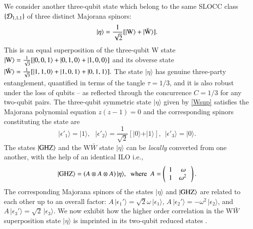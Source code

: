 {We consider another three-qubit state which belong to the same SLOCC class $\{{\cal D}_{1,1,1}\}$ of three distinct Majorana spinors: 
\begin{equation}
\vert \eta\rangle = \frac{1}{\sqrt{2}} [\vert {\rm W}\rangle +  \vert{\rm \bar{W}}\rangle].\label{Wsup}
\end{equation}         
This  is an equal superposition of the three-qubit W state $\vert{\rm W}\rangle=\frac{1}{\sqrt{3}}[\vert 0,0,1\rangle+\vert 0,1,0\rangle+\vert 1,0,0\rangle]$  
 and its obverse state $\vert{\rm \bar{W}}\rangle=\frac{1}{\sqrt{3}}[\vert 1,1,0\rangle+\vert 1,0,1\rangle+\vert 0,1,1\rangle].$ The state $\vert \eta\rangle$ has genuine three-party entanglement, quantified in terms of the tangle $\tau=1/3$, and it is also robust under the loss of qubits -- as reflected through the concurrence $C=1/3$ for any two-qubit pairs.  The three-qubit symmetric state $\vert \eta\rangle$ given by \eqref{Wsup} satisfies the Majorana polynomial equation $z(z-1)=0$  and the corresponding spinors constituting the state are 
\begin{equation}
\vert \epsilon'_1\rangle =\vert 1\rangle,\ \ \  \vert \epsilon'_2\rangle =\frac{1}{\sqrt{2}}[\vert 0\rangle+ \vert 1\rangle], \ \ \vert \epsilon'_3\rangle = \vert 0\rangle. 
\end{equation}
The states $\vert {\rm GHZ}\rangle$ and the W$\bar W$ state $\vert \eta\rangle$   can be {\em locally} converted from one another,  with the help of an identical ILO i.e.,
\begin{equation}
\vert {\rm GHZ}\rangle=\left(A\otimes A\otimes A\right) \vert \eta\rangle,\ \   \mbox{where}\ \ A=\left(\begin{array}{cc} 1 & \omega \\ 1 & \omega^2\, \end{array}\right).\label{GHZ&eta}
\end{equation}
The corresponding Majorana spinors  of the states $\vert \eta\rangle$ and $\vert{\rm GHZ}\rangle$ are  related to each other up to an overall factor: $A\, \vert\epsilon_1'\rangle=\sqrt{2}\omega\, \vert\epsilon_1\rangle$, $A\, \vert\epsilon_2'\rangle=-\omega^2\, \vert\epsilon_2\rangle$, and $A\, \vert\epsilon_3'\rangle=   \sqrt{2}\,  \vert\epsilon_3\rangle$. We now exhibit how the higher order correlation in  the W$\bar W$ superposition state $\vert \eta\rangle$ is imprinted in its two-qubit reduced states \cite{SP1,usa,usa1,usa2}. 

}
